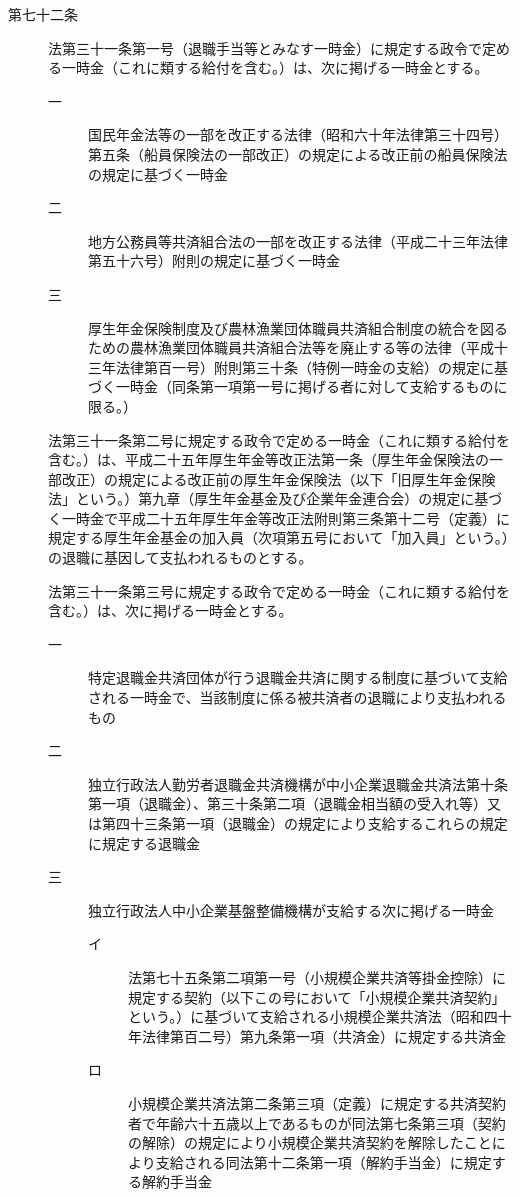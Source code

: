 \documentclass[twocolumn,a4j,10pt]{ltjtarticle}
\begin{document}
\begin{description}
\item[第七十二条]法第三十一条第一号（退職手当等とみなす一時金）に規定する政令で定める一時金（これに類する給付を含む。）は、次に掲げる一時金とする。
\begin{description}
\item[一]国民年金法等の一部を改正する法律（昭和六十年法律第三十四号）第五条（船員保険法の一部改正）の規定による改正前の船員保険法の規定に基づく一時金
\item[二]地方公務員等共済組合法の一部を改正する法律（平成二十三年法律第五十六号）附則の規定に基づく一時金
\item[三]厚生年金保険制度及び農林漁業団体職員共済組合制度の統合を図るための農林漁業団体職員共済組合法等を廃止する等の法律（平成十三年法律第百一号）附則第三十条（特例一時金の支給）の規定に基づく一時金（同条第一項第一号に掲げる者に対して支給するものに限る。）
\end{description}
\item[]法第三十一条第二号に規定する政令で定める一時金（これに類する給付を含む。）は、平成二十五年厚生年金等改正法第一条（厚生年金保険法の一部改正）の規定による改正前の厚生年金保険法（以下「旧厚生年金保険法」という。）第九章（厚生年金基金及び企業年金連合会）の規定に基づく一時金で平成二十五年厚生年金等改正法附則第三条第十二号（定義）に規定する厚生年金基金の加入員（次項第五号において「加入員」という。）の退職に基因して支払われるものとする。
\item[]法第三十一条第三号に規定する政令で定める一時金（これに類する給付を含む。）は、次に掲げる一時金とする。
\begin{description}
\item[一]特定退職金共済団体が行う退職金共済に関する制度に基づいて支給される一時金で、当該制度に係る被共済者の退職により支払われるもの
\item[二]独立行政法人勤労者退職金共済機構が中小企業退職金共済法第十条第一項（退職金）、第三十条第二項（退職金相当額の受入れ等）又は第四十三条第一項（退職金）の規定により支給するこれらの規定に規定する退職金
\item[三]独立行政法人中小企業基盤整備機構が支給する次に掲げる一時金
\begin{description}
\item[イ]法第七十五条第二項第一号（小規模企業共済等掛金控除）に規定する契約（以下この号において「小規模企業共済契約」という。）に基づいて支給される小規模企業共済法（昭和四十年法律第百二号）第九条第一項（共済金）に規定する共済金
\item[ロ]小規模企業共済法第二条第三項（定義）に規定する共済契約者で年齢六十五歳以上であるものが同法第七条第三項（契約の解除）の規定により小規模企業共済契約を解除したことにより支給される同法第十二条第一項（解約手当金）に規定する解約手当金

\end{description}
\end{description}
\end{description}
\end{document}
